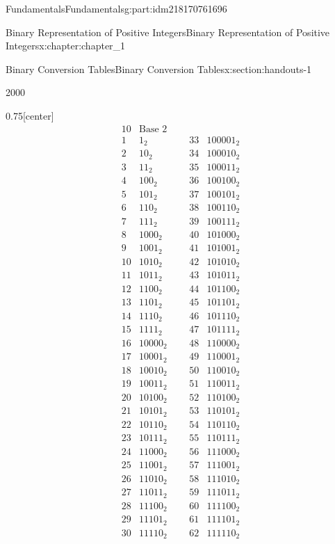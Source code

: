 \documentclass[oneside,10pt,]{book}
\numberwithin{equation}{section}
\begin{document}
\begin{partptx}{Fundamentals}{}{Fundamentals}{}{}{g:part:idm218170761696}
\begin{chapterptx}{Binary Representation of Positive Integers}{}{Binary Representation of Positive Integers}{}{}{x:chapter:chapter_1}
\begin{sectionptx}{Binary Conversion Tables}{}{Binary Conversion Tables}{}{}{x:section:handouts-1}
\begin{sidebyside}{2}{0}{0}{0}
\begin{sbspanel}{0.75}[center]
\begin{equation*}
\begin{array}{ccccc}
{10} & \text{Base 2} \\
1 & 1_2 & \text{     } & 33 &
100001_2 \\
2 & 10_2 & \text{     } & 34
& 100010_2 \\
3 & 11_2 & \text{     } & 35
& 100011_2 \\
4 & 100_2 & \text{     } & 36
& 100100_2 \\
5 & 101_2 & \text{     } & 37
& 100101_2 \\
6 & 110_2 & \text{     } & 38
& 100110_2 \\
7 & 111_2 & \text{     } & 39
& 100111_2 \\
8 & 1000_2 & \text{     } &
40 & 101000_2 \\
9 & 1001_2 & \text{     } &
41 & 101001_2 \\
10 & 1010_2 & \text{     } &
42 & 101010_2 \\
11 & 1011_2 & \text{     } &
43 & 101011_2 \\
12 & 1100_2 & \text{     } &
44 & 101100_2 \\
13 & 1101_2 & \text{     } &
45 & 101101_2 \\
14 & 1110_2 & \text{     } &
46 & 101110_2 \\
15 & 1111_2 & \text{     } &
47 & 101111_2 \\
16 & 10000_2 & \text{     } &
48 & 110000_2 \\
17 & 10001_2 & \text{     } &
49 & 110001_2 \\
18 & 10010_2 & \text{     } &
50 & 110010_2 \\
19 & 10011_2 & \text{     } &
51 & 110011_2 \\
20 & 10100_2 & \text{     } &
52 & 110100_2 \\
21 & 10101_2 & \text{     } &
53 & 110101_2 \\
22 & 10110_2 & \text{     } &
54 & 110110_2 \\
23 & 10111_2 & \text{     } &
55 & 110111_2 \\
24 & 11000_2 & \text{     } &
56 & 111000_2 \\
25 & 11001_2 & \text{     } &
57 & 111001_2 \\
26 & 11010_2 & \text{     } &
58 & 111010_2 \\
27 & 11011_2 & \text{     } &
59 & 111011_2 \\
28 & 11100_2 & \text{     } &
60 & 111100_2 \\
29 & 11101_2 & \text{     } &
61 & 111101_2 \\
30 & 11110_2 & \text{     } &
62 & 111110_2 \\

\end{array}
\end{equation*}
\end{sbspanel}
\end{sidebyside}
\end{sectionptx}
\end{chapterptx}
\end{partptx}
\end{document}
